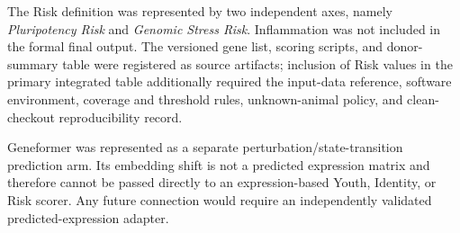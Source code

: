\documentclass[10pt,twocolumn]{article}
\begin{document}
The Risk definition was represented by two independent axes, namely
\textit{Pluripotency Risk} and \textit{Genomic Stress Risk}. Inflammation was not
included in the formal final output. The versioned gene list, scoring scripts,
and donor-summary table were registered as source artifacts; inclusion of Risk
values in the primary integrated table additionally required the input-data
reference, software environment, coverage and threshold rules, unknown-animal
policy, and clean-checkout reproducibility record.

Geneformer was represented as a separate perturbation/state-transition prediction
arm. Its embedding shift is not a predicted expression matrix and therefore
cannot be passed directly to an expression-based Youth, Identity, or Risk
scorer. Any future connection would require an independently validated
predicted-expression adapter.
\end{document}
